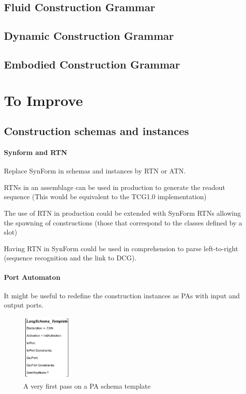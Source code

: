 \documentclass{article}
\begin{document}
\subsection{Fluid Construction Grammar}
\subsection{Dynamic Construction Grammar}
\subsection{Embodied Construction Grammar}

\section{To Improve}

\subsection{Construction schemas and instances}

\paragraph{Synform and RTN}
Replace SynForm in schemas and instances by RTN or ATN.

RTNs in an assemblage can be used in production to generate the readout sequence (This would be equivalent to the TCG1.0 implementation)

The use of RTN in production could be extended with SynForm RTNs allowing the spawning of constructions (those that correspond to the classes defined by a slot)

Having RTN in SynForm could be used in comprehension to parse left-to-right (sequence recognition and the link to DCG).

\paragraph{Port Automaton}
It might be useful to redefine the construction instances as PAs with input and output ports.

\begin{figure}[H]
	\centering
	\includegraphics[width=1.0in]{Figures/LanguageSchemaTemplate.png}
	\caption{A very first pass on a PA schema template}
	\label{fig:lex_cxn_feat_struct}
\end{figure}
\end{document}
